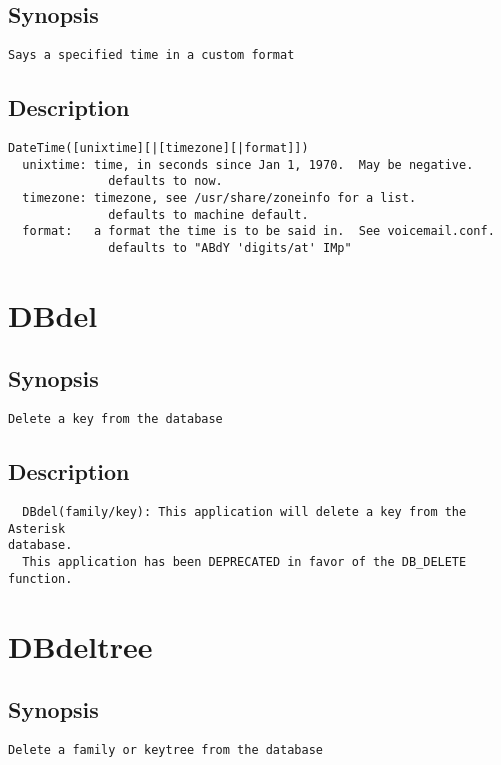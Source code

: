 \subsection{Synopsis}
\begin{verbatim}
Says a specified time in a custom format
\end{verbatim}
\subsection{Description}
\begin{verbatim}
DateTime([unixtime][|[timezone][|format]])
  unixtime: time, in seconds since Jan 1, 1970.  May be negative.
              defaults to now.
  timezone: timezone, see /usr/share/zoneinfo for a list.
              defaults to machine default.
  format:   a format the time is to be said in.  See voicemail.conf.
              defaults to "ABdY 'digits/at' IMp"

\end{verbatim}


\section{DBdel}
\subsection{Synopsis}
\begin{verbatim}
Delete a key from the database
\end{verbatim}
\subsection{Description}
\begin{verbatim}
  DBdel(family/key): This application will delete a key from the Asterisk
database.
  This application has been DEPRECATED in favor of the DB_DELETE function.

\end{verbatim}


\section{DBdeltree}
\subsection{Synopsis}
\begin{verbatim}
Delete a family or keytree from the database
\end{verbatim}
